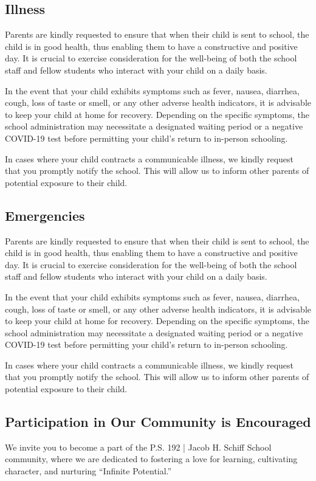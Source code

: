 \documentclass[letterpaper, 11pt]{article}
\begin{document}
\subsection{Illness}
\label{sec:org08e0061}
Parents are kindly requested to ensure that when their child is sent to school, the child is in good health, thus enabling them to have a constructive and positive day. It is crucial to exercise consideration for the well-being of both the school staff and fellow students who interact with your child on a daily basis.

In the event that your child exhibits symptoms such as fever, nausea, diarrhea, cough, loss of taste or smell, or any other adverse health indicators, it is advisable to keep your child at home for recovery. Depending on the specific symptoms, the school administration may necessitate a designated waiting period or a negative COVID-19 test before permitting your child’s return to in-person schooling.

In cases where your child contracts a communicable illness, we kindly request that you promptly notify the school. This will allow us to inform other parents of potential exposure to their child.

\subsection{Emergencies}
\label{sec:org6f59ebd}
Parents are kindly requested to ensure that when their child is sent to school, the child is in good health, thus enabling them to have a constructive and positive day. It is crucial to exercise consideration for the well-being of both the school staff and fellow students who interact with your child on a daily basis.

In the event that your child exhibits symptoms such as fever, nausea, diarrhea, cough, loss of taste or smell, or any other adverse health indicators, it is advisable to keep your child at home for recovery. Depending on the specific symptoms, the school administration may necessitate a designated waiting period or a negative COVID-19 test before permitting your child’s return to in-person schooling.

In cases where your child contracts a communicable illness, we kindly request that you promptly notify the school. This will allow us to inform other parents of potential exposure to their child.

\subsection{Participation in Our Community is Encouraged}
\label{sec:org3f44688}
We invite you to become a part of the P.S. 192 | Jacob H. Schiff School community, where we are dedicated to fostering a love for learning, cultivating character, and nurturing ``Infinite Potential.''
\end{document}
